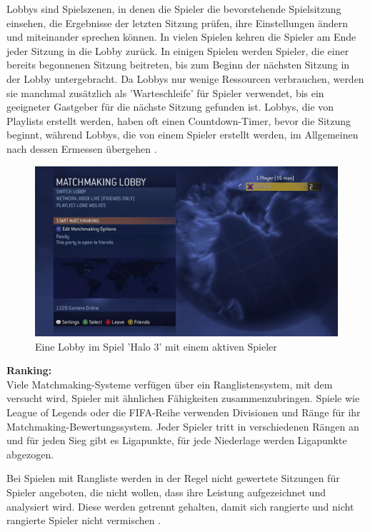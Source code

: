 Lobbys sind Spielszenen, in denen die Spieler die bevorstehende Spielsitzung einsehen, die Ergebnisse der letzten Sitzung prüfen, ihre Einstellungen ändern und miteinander sprechen können. In vielen Spielen kehren die Spieler am Ende jeder Sitzung in die Lobby zurück. In einigen Spielen werden Spieler, die einer bereits begonnenen Sitzung beitreten, bis zum Beginn der nächsten Sitzung in der Lobby untergebracht. Da Lobbys nur wenige Ressourcen verbrauchen, werden sie manchmal zusätzlich als 'Warteschleife' für Spieler verwendet, bis ein geeigneter Gastgeber für die nächste Sitzung gefunden ist. Lobbys, die von Playlists erstellt werden, haben oft einen Countdown-Timer, bevor die Sitzung beginnt, während Lobbys, die von einem Spieler erstellt werden, im Allgemeinen nach dessen Ermessen übergehen \cite{Wikipedia.2021b}. 

\begin{figure}[H]
	\centering
	\includegraphics[width=120mm]{images/halo3_lobby.jpg}
	\caption['Halo 3' Lobby]{Eine Lobby im Spiel 'Halo 3' mit einem aktiven Spieler}
	\label{pic:Dota2_Party_Invite}
\end{figure}

\textbf{Ranking:} \\
Viele Matchmaking-Systeme verfügen über ein Ranglistensystem, mit dem versucht wird, Spieler mit ähnlichen Fähigkeiten zusammenzubringen. Spiele wie League of Legends oder die FIFA-Reihe verwenden Divisionen und Ränge für ihr Matchmaking-Bewertungssystem. Jeder Spieler tritt in verschiedenen Rängen an und für jeden Sieg gibt es Ligapunkte, für jede Niederlage werden Ligapunkte abgezogen.

Bei Spielen mit Rangliste werden in der Regel nicht gewertete Sitzungen für Spieler angeboten, die nicht wollen, dass ihre Leistung aufgezeichnet und analysiert wird. Diese werden getrennt gehalten, damit sich rangierte und nicht rangierte Spieler nicht vermischen \cite{Wikipedia.2021b}. 

